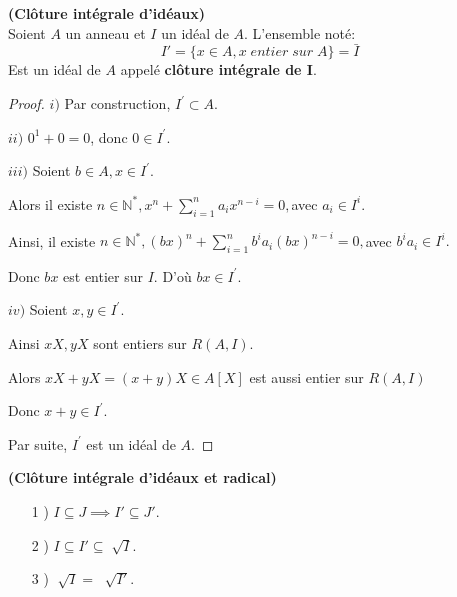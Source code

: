 \begin{moncorollaire}\textbf{(Clôture intégrale d'idéaux)}\cite{2}\\
	Soient $A$ un anneau et $I$ un idéal de $A$.
	L'ensemble noté: 
	\[ I'=\{x \in A, x \; entier \; sur \; A \} = \bar{I} \]
	Est un idéal de $A$ appelé \textbf{clôture intégrale de I}.
\end{moncorollaire}
\begin{proof}
	$i)$ Par construction, $I^{\prime }\subset A.$
	
	$ii)$ $0^{1}+0=0$, donc $0\in I^{\prime }.$
	
	$iii)$ Soient $b\in A,x\in I^{\prime }.$
	
	Alors il existe $n\in \mathbb{N}^{\ast },x^{n}+\sum\limits_{i=1}^{n}a_{i}x^{n-i}=0,$avec $a_{i}\in I^{i}.$
	
	Ainsi, il existe $n\in \mathbb{N}^{\ast },(bx)^{n}+\sum\limits_{i=1}^{n}b^{i}a_{i}(bx)^{n-i}=0,$avec $%
	b^{i}a_{i}\in I^{i}.$
	
	Donc $bx$ est entier sur $I.$ D'où $bx\in I^{\prime }.$
	
	$iv)$ Soient $x,y\in I^{\prime }.$
	
	Ainsi $xX,yX$ sont entiers sur $R(A,I).$
	
	Alors $xX+yX=(x+y)X\in A[X]$ est aussi entier sur $R(A,I)$
	
	Donc $x+y\in I^{\prime }.$
	
	Par suite, $I^{\prime }$ est un idéal de $A.$
\end{proof}
\begin{maremarque}\textbf{(Clôture intégrale d'idéaux et radical)}\cite{2}\\
	\begin{enumerate}
		\item[1] ) $I \subseteq J \implies I' \subseteq J' $.
		\item[2] ) $I \subseteq I' \subseteq \sqrt[]{I} $.
		\item[3] ) $\sqrt[]{I} = \; \sqrt[]{I'} $.
	\end{enumerate}
\end{maremarque}
